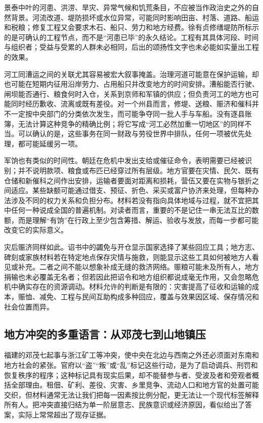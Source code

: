 景泰中叶的河患、洪涝、旱灾、异常气候和饥荒条目，不应被当作政治史之外的自然背景。河流改道、堤防损坏或水位异常，可能同时影响田亩、村落、道路、船运和税粮；修复工程又会要求木石、船只、劳力和地方经费。徐有贞修缮堤防所标示的是可确认的工程节点，而不是“河患已毕”的永久结论。工程有其具体河段、时间与组织者；受益与受累的人群未必相同，后出的颂扬性文字也未必能如实量出工程的效果。

河工同漕运之间的关联尤其容易被宏大叙事掩盖。治理河道可能意在保护运输，却也可能在短期内征用沿岸劳力、占用船只并改变地方的时间安排。漕船能否行驶、闸坝能否通行、粮食何时入仓，关系到京师和军镇的供应；但负责河工的地方也可能同时经历歉收、流离或既有差役。对一个州县而言，修堤、送粮、赈济和催科并不一定按中央部门的分类依次发生，而可能争夺同一批人手与车船。没有逐县账簿，无法计算这种竞争的精确比例；将它写成“河工必然加重一切地区”的同样不当。可以确认的是，这些事务在同一财政与劳役世界中排队，任何一项被优先处理，都可能延缓另一项。

军饷也有类似的时间性。朝廷在危机中发出支给或催征命令，表明需要已经被识别；并不说明款项、粮食或布匹已经穿过所有层级。地方官要在灾情、民欠、既有仓储和新催科之间作出安排，运输者要面对距离和损耗，营伍又要在实物与银折之间适应。某些缺额可能通过借支、预征、折色、采买或富户协济来处理，但每种办法涉及不同的权力关系和负担分布。材料若没有指向具体地域与过程，就不宜把其中任何一种说成全国的普遍机制。对读者而言，重要的不是记住一串无法互比的数额，而是理解“有饷”在行政上至少包含筹措、解运、验收与发放，而每一步都可能改变它的实际意义。

灾后赈济同样如此。诏书中的蠲免与开仓显示国家选择了某些回应工具；地方志、碑刻或家族材料若在特定地点保存灾情与施救，则能显示这些工具如何被地方人看见或补充。二者之间不能以想象补成无缝的救济网络。赈粮可能未及所有人，地方捐输也未必覆盖无名者；但若因此把诏令和地方组织都说成毫无作用，又会忽略危机中确实存在的资源调动。材料允许的判断是有限的：灾害提高了征收和运输的成本，赈恤、减免、工程与民间互助构成多种回应，覆盖与效果因区域、保存情况和社会位置而异。

\subsection{地方冲突的多重语言：从邓茂七到山地镇压}

福建的邓茂七起事与浙江矿工等冲突，使中央在北边与西南之外还必须面对东南和地方社会的紧张。官府以“盗”“叛”或“乱”标记这些行动，是为了启动调兵、刑罚和恢复秩序的程序；这种标记具有现实后果，却不能替参与者、受波及者和旁观者概括全部理由。租佃、矿利、差役、灾害、乡里竞争、流动人口和地方官的处置可能交织，但材料通常无法让我们把每一因素按比例分配，更无法让一个现代标签解释所有人。把冲突直接归结为单一阶层意志、民族意识或经济原因，看似给出了答案，实际上常常超出了现存证据。


